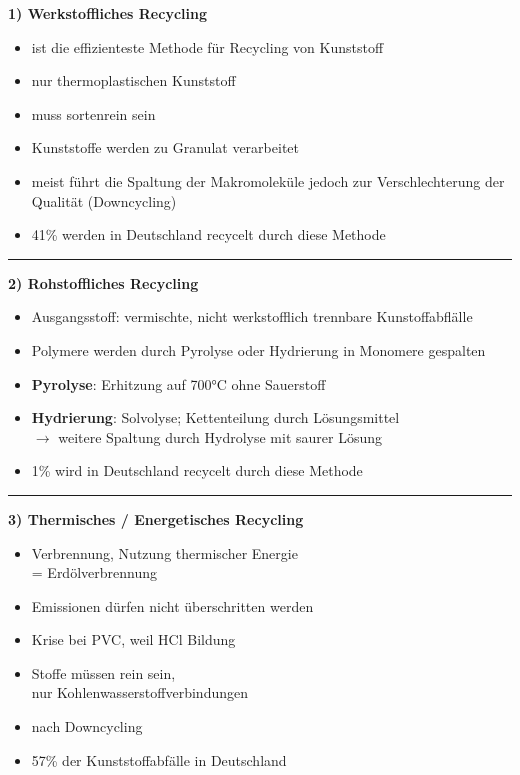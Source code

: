 \begin{multicols}{2}

    \textbf{1) Werkstoffliches Recycling} 
    \begin{itemize}
        \item ist die effizienteste Methode für Recycling von Kunststoff
        \item nur thermoplastischen Kunststoff
        \item muss sortenrein sein
        \item Kunststoffe werden zu Granulat verarbeitet
        \item meist führt die Spaltung der Makromoleküle jedoch zur Verschlechterung der Qualität (Downcycling)
        \item 41\% werden in Deutschland recycelt durch diese Methode
    \end{itemize}

\end{multicols}
\hrule
\vspace{0.3cm}
\begin{multicols}{2}

    \textbf{2) Rohstoffliches Recycling} 
    \begin{itemize}
        \item Ausgangsstoff: vermischte, nicht werkstofflich trennbare Kunstoffabflälle
        \item Polymere werden durch Pyrolyse oder Hydrierung in Monomere gespalten
        \item \textbf{Pyrolyse}: Erhitzung auf 700°C ohne Sauerstoff
        \item \textbf{Hydrierung}: Solvolyse; Kettenteilung durch Lösungsmittel \\
            $\rightarrow$ weitere Spaltung durch Hydrolyse mit saurer Lösung
        \item 1\% wird in Deutschland recycelt durch diese Methode
    \end{itemize}

\end{multicols}
\hrule
\vspace{0.3cm}
\begin{multicols}{2}

    \textbf{3) Thermisches / Energetisches Recycling}
    \begin{itemize}
        \item Verbrennung, Nutzung thermischer Energie \\ = Erdölverbrennung
        \item Emissionen dürfen nicht überschritten werden
        \item Krise bei PVC, weil HCl Bildung
        \item Stoffe müssen rein sein, \\ nur Kohlenwasserstoffverbindungen
        \item nach Downcycling
        \item 57\% der Kunststoffabfälle in Deutschland
    \end{itemize}

\end{multicols}

